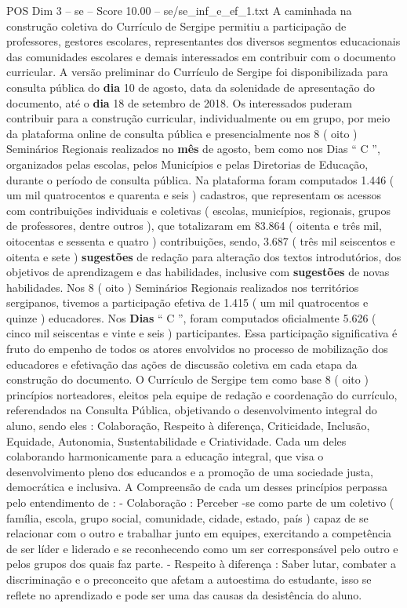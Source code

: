 \begin{textsample}{POS Dim 3 – se – Score 10.00 – se/se\_inf\_e\_ef\_1.txt}
A caminhada na construção coletiva do Currículo de Sergipe permitiu a participação de professores, gestores escolares, representantes dos diversos segmentos educacionais das comunidades escolares e demais interessados em contribuir com o documento curricular.
A versão preliminar do Currículo de Sergipe foi disponibilizada para consulta pública do \textbf{dia} 10 de agosto, data da solenidade de apresentação do documento, até o \textbf{dia} 18 de setembro de 2018.
Os interessados puderam contribuir para a construção curricular, individualmente ou em grupo, por meio da plataforma online de consulta pública e presencialmente nos 8 ( oito ) Seminários Regionais realizados no \textbf{mês} de agosto, bem como nos Dias “ C ”, organizados pelas escolas, pelos Municípios e pelas Diretorias de Educação, durante o período de consulta pública.
Na plataforma foram computados 1.446 ( um mil quatrocentos e quarenta e seis ) cadastros, que representam os acessos com contribuições individuais e coletivas ( escolas, municípios, regionais, grupos de professores, dentre outros ), que totalizaram em 83.864 ( oitenta e três mil, oitocentas e sessenta e quatro ) contribuições, sendo, 3.687 ( três mil seiscentos e oitenta e sete ) \textbf{sugestões} de redação para alteração dos textos introdutórios, dos objetivos de aprendizagem e das habilidades, inclusive com \textbf{sugestões} de novas habilidades.
Nos 8 ( oito ) Seminários Regionais realizados nos territórios sergipanos, tivemos a participação efetiva de 1.415 ( um mil quatrocentos e quinze ) educadores.
Nos \textbf{Dias} “ C ”, foram computados oficialmente 5.626 ( cinco mil seiscentas e vinte e seis ) participantes.
Essa participação significativa é fruto do empenho de todos os atores envolvidos no processo de mobilização dos educadores e efetivação das ações de discussão coletiva em cada etapa da construção do documento.
O Currículo de Sergipe tem como base 8 ( oito ) princípios norteadores, eleitos pela equipe de redação e coordenação do currículo, referendados na Consulta Pública, objetivando o desenvolvimento integral do aluno, sendo eles : Colaboração, Respeito à diferença, Criticidade, Inclusão, Equidade, Autonomia, Sustentabilidade e Criatividade.
Cada um deles colaborando harmonicamente para a educação integral, que visa o desenvolvimento pleno dos educandos e a promoção de uma sociedade justa, democrática e inclusiva.
A Compreensão de cada um desses princípios perpassa pelo entendimento de : - Colaboração : Perceber -se como parte de um coletivo ( família, escola, grupo social, comunidade, cidade, estado, país ) capaz de se relacionar com o outro e trabalhar junto em equipes, exercitando a competência de ser líder e liderado e se reconhecendo como um ser corresponsável pelo outro e pelos grupos dos quais faz parte. - Respeito à diferença : Saber lutar, combater a discriminação e o preconceito que afetam a autoestima do estudante, isso se reflete no aprendizado e pode ser uma das causas da desistência do aluno.

\end{textsample}
